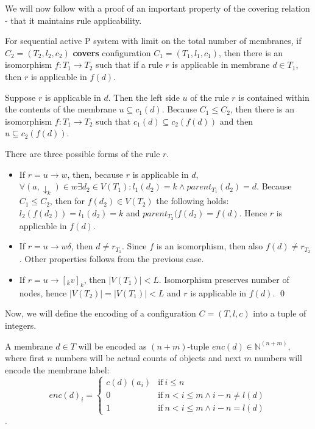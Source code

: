 We will now follow with a proof of an important property of the covering relation - that it maintains rule applicability.

\begin{lemma}
\label{rule_applicability_lemma}
  For sequential active P system with limit on the total number of membranes, if $C_2 = (T_2, l_2, c_2)$ {\bf covers} configuration $C_1 = (T_1, l_1, c_1)$, then there is an  isomorphism $f: T_1\rightarrow T_2$ such that if a rule $r$ is applicable in membrane $d\in T_1$, then $r$ is applicable in $f(d)$.
\end{lemma}

\begin{dokaz}
  Suppose $r$ is applicable in $d$. Then the left side $u$ of the rule $r$ is contained within the contents of the membrane $u\subseteq c_1(d)$. Because $C_1\leq C_2$, then there is an isomorphism $f:T_1\rightarrow T_2$ such that $c_1(d)\subseteq c_2(f(d))$ and then $u\subseteq c_2(f(d))$.

  There are three possible forms of the rule $r$.
  \begin{itemize}
    \item If $r = u\rightarrow w$, then, because $r$ is applicable in $d$, $\forall (a,\downarrow_k)\in w \exists d_2\in V(T_1): l_1(d_2)=k \wedge parent_{T_1}(d_2) = d$. Because $C_1\leq C_2$, then for $f(d_2)\in V(T_2)$ the following holds: $l_2(f(d_2)) = l_1(d_2) = k$ and $parent_{T_2}(f(d_2) = f(d)$. Hence $r$ is applicable in $f(d)$.
    \item If $r = u\rightarrow w\delta$, then $d\neq r_{T_1}$. Since $f$ is an isomorphism, then also $f(d)\neq r_{T_2}$. Other properties follows from the previous case.
    \item If $r = u\rightarrow [_k v]_k$, then $|V(T_1)|<L$. Isomorphism preserves number of nodes, hence $|V(T_2)| = |V(T_1)| < L$ and $r$ is applicable in $f(d)$. \qed
  \end{itemize}
\end{dokaz}

Now, we will define the encoding of a configuration $C = (T, l, c)$ into a tuple of integers.

A membrane $d\in T$ will be encoded as $(n+m)$-tuple $enc(d)\in\mathbb N^{(n+m)}$, where first $n$ numbers will be actual counts of objects and next $m$ numbers will encode the membrane label:
\[
  enc(d)_{i} =
  \begin{cases}
    c(d)(a_i) & \text{if}\ i\leq n\\
    0 & \text{if}\ n<i\leq m\wedge i-n\neq l(d)\\
    1 & \text{if}\ n<i\leq m\wedge i-n=l(d)
  \end{cases}
\].

